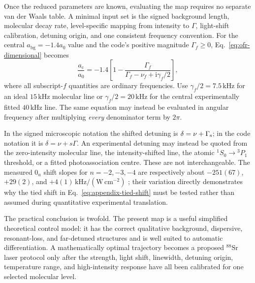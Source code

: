 \documentclass[9pt,a4paper,twocolumn,twoside]{rho-class/rho}
\newcommand{\ac}{a_{\mathrm{c}}}
\newcommand{\abg}{a_{\mathrm{bg}}}
\newcommand{\ii}{\mathrm{i}}
\begin{document}
        Once the reduced parameters are known, evaluating the map requires no
        separate van der Waals table.  A minimal input set is the signed
        background length, molecular decay rate, level-specific mapping from
        intensity to $\Gamma$, light-shift calibration, detuning origin, and one
        consistent frequency convention.  For the central
        $\abg=-1.4a_0$ value and the code's positive magnitude
        $\Gamma_f\geq0$, Eq.~\eqref{eq:ofr-dimensional} becomes
        \begin{equation}
            \frac{\ac}{a_0}=-1.4\left[
            1-\frac{\Gamma_f}
            {\Gamma_f-\nu_f+\ii\gamma_f/2}\right],
            \label{eq:appendix-sr-explicit}
        \end{equation}
        where all subscript-$f$ quantities are ordinary frequencies.  Use
        $\gamma_f/2=7.5\,\mathrm{kHz}$ for an ideal
        $15\,\mathrm{kHz}$ molecular line or
        $\gamma_f/2=20\,\mathrm{kHz}$ for the central experimentally fitted
        $40\,\mathrm{kHz}$ line.  The same equation may instead be evaluated in
        angular frequency after multiplying \emph{every} denominator term by
        $2\pi$.

        In the signed microscopic notation the shifted detuning is
        $\delta=\nu+\Gamma_{\rm s}$; in the code notation it is
        $\delta=\nu+s\Gamma$.  An experimental detuning may instead be quoted
        from the zero-intensity molecular line, the intensity-shifted line, the
        atomic $^1S_0\rightarrow{}^3P_1$ threshold, or a fitted photoassociation
        centre. These are not interchangeable.  The measured $0_u$ shift
        slopes for $n=-2,-3,-4$ are respectively about $-251(67)$,
        $+29(2)$, and $+4(1)\,\mathrm{kHz}/(\mathrm{W\,cm^{-2}})$
        \cite{blatt2011measurement}; their variation directly demonstrates why
        the tied shift in Eq.~\eqref{eq:appendix-tied-shift} must be tested rather
        than assumed during quantitative experimental translation.

        The practical conclusion is twofold.  The present map is a useful
        simplified theoretical control model: it has the correct qualitative
        background, dispersive, resonant-loss, and far-detuned structures and
        is well suited to automatic differentiation.  A mathematically optimal
        trajectory becomes a proposed $^{88}\mathrm{Sr}$ laser protocol only
        after the strength, light shift, linewidth, detuning origin, temperature
        range, and high-intensity response have all been calibrated for one
        selected molecular level.
\end{document}
